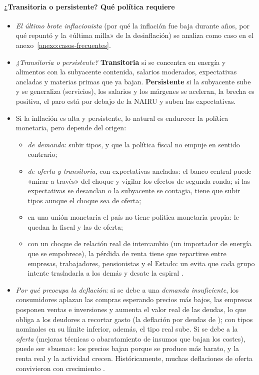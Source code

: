 \documentclass[11pt]{article}
\begin{document}
\paragraph{¿Transitoria o persistente? Qué política requiere}
\begin{itemize}
\item \emph{El último brote inflacionista} (por qué la inflación fue baja durante años, por qué repuntó y la «última milla» de la desinflación) se analiza como caso en el anexo~\ref{anexo:casos-frecuentes}.
\item \emph{¿Transitoria o persistente?} \textbf{Transitoria} si se concentra en energía y alimentos con la subyacente contenida, salarios moderados, expectativas ancladas y materias primas que ya bajan. \textbf{Persistente} si la subyacente sube y se generaliza (servicios), los salarios y los márgenes se aceleran, la brecha es positiva, el paro está por debajo de la NAIRU y suben las expectativas.
\item Si la inflación es alta y persistente, lo natural es endurecer la política monetaria, pero depende del origen:
  \begin{itemize}
  \item \emph{de demanda}: subir tipos, y que la política fiscal no empuje en sentido contrario;
  \item \emph{de oferta y transitoria}, con expectativas ancladas: el banco central puede «mirar a través» del choque y vigilar los efectos de segunda ronda; si las expectativas se desanclan o la subyacente se contagia, tiene que subir tipos aunque el choque sea de oferta;
  \item en una unión monetaria el país no tiene política monetaria propia: le quedan la fiscal y las de oferta;
  \item con un choque de relación real de intercambio (un importador de energía que se empobrece), la pérdida de renta tiene que repartirse entre empresas, trabajadores, pensionistas y el Estado: un  evita que cada grupo intente trasladarla a los demás y desate la espiral \parencite{BdE2022InformeAnual2021}.
  \end{itemize}
\item \emph{Por qué preocupa la deflación}: si se debe a una \emph{demanda insuficiente}, los consumidores aplazan las compras esperando precios más bajos, las empresas posponen ventas e inversiones y aumenta el valor real de las deudas, lo que obliga a los deudores a recortar gasto (la deflación por deudas de \textcite{Fisher1933}); con tipos nominales en su límite inferior, además, el tipo real sube. Si se debe a la \emph{oferta} (mejoras técnicas o abaratamiento de insumos que bajan los costes), puede ser «buena»: los precios bajan porque se produce más barato, y la renta real y la actividad crecen. Históricamente, muchas deflaciones de oferta convivieron con crecimiento \parencite{BordoFilardo2005Deflacion} .

\end{itemize}
\end{document}
